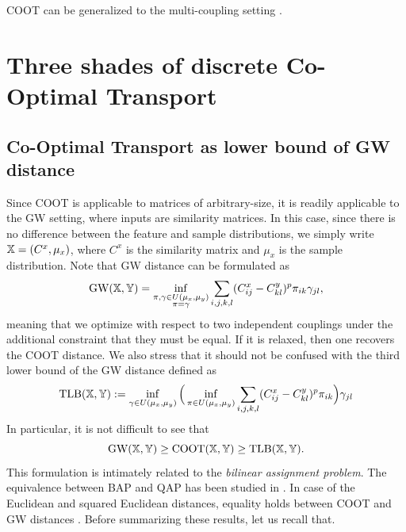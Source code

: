 COOT can be generalized to the multi-coupling setting \citep{Kerdoncuff22}.

\section{Three shades of discrete Co-Optimal Transport}

\subsection{Co-Optimal Transport as lower bound of GW distance} \label{subsec:GWLB}

Since COOT is applicable to matrices of arbitrary-size, it is readily applicable to the GW setting,
where inputs are similarity matrices. In this case, since there is no difference between
the feature and sample distributions, we simply write $\mathbb X = (C^x, \mu_x)$,
where $C^x$ is the similarity matrix and $\mu_x$ is the sample distribution.
Note that GW distance can be formulated as
\begin{align}
  \text{GW}(\mathbb X, \mathbb Y) =
  \inf_{\substack{\pi, \gamma \in U(\mu_x, \mu_y) \\ \pi = \gamma }}
  \sum_{i,j,k,l} (C^x_{ij} - C^y_{kl})^p \pi_{ik} \gamma_{jl},
\end{align}
meaning that we optimize with respect to two independent couplings
under the additional constraint that they must be equal. If it is relaxed, then
one recovers the COOT distance. We also stress that it should not
be confused with the third lower bound of the GW distance \citep{Memoli07,Memoli11} defined as
\begin{equation}
  \text{TLB}(\mathbb X, \mathbb Y) :=
  \inf_{\gamma \in U(\mu_x, \mu_y)}
  \Big( \inf_{\pi \in U(\mu_x, \mu_y)} \sum_{i,j,k,l} (C^x_{ij} - C^y_{kl})^p \pi_{ik} \Big)
  \gamma_{jl}
\end{equation}
In particular, it is not difficult to see that
\begin{equation}
  \label{gw_tlb_COOT}
  \text{GW}(\mathbb X, \mathbb Y) \geq \text{COOT}(\mathbb X, \mathbb Y)
  \geq \text{TLB}(\mathbb X, \mathbb Y).
\end{equation}
This formulation is intimately related to the \textit{bilinear assignment problem}.
The equivalence between BAP and QAP has been studied in \citep{Konno76}.
In case of the Euclidean and squared Euclidean distances, equality holds between
COOT and GW distances \citep{Sejourne20,Redko20}. Before summarizing these results,
let us recall that.
